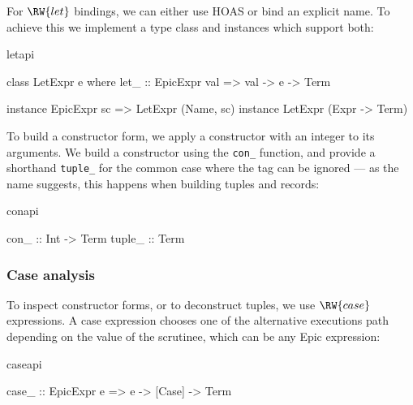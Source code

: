 \noindent
For $\RW{let}$ bindings, we can either use HOAS or bind
an explicit name. To achieve this we implement a type
class and instances which support both:

\begin{SaveVerbatim}{letapi}

class LetExpr e where
    let_ :: EpicExpr val => val -> e -> Term

instance EpicExpr sc => LetExpr (Name, sc)
instance                LetExpr (Expr -> Term)

\end{SaveVerbatim}





\noindent
To build a constructor form, we apply a constructor with an integer
 to its arguments. We build a constructor using the
\texttt{con\_} function, and provide a shorthand \texttt{tuple\_} for
the common case where the tag can be ignored --- as the name suggests,
this happens when building tuples and records:

\begin{SaveVerbatim}{conapi}

con_   :: Int -> Term
tuple_ :: Term
\end{SaveVerbatim}

\subsubsection*{Case analysis}

\noindent
To inspect constructor forms, or to deconstruct tuples, we use
$\RW{case}$ expressions. A case expression chooses one of the
alternative executions path depending on the value of the scrutinee,
which can be any Epic expression:

\begin{SaveVerbatim}{caseapi}

case_ :: EpicExpr e => e -> [Case] -> Term

\end{SaveVerbatim}

